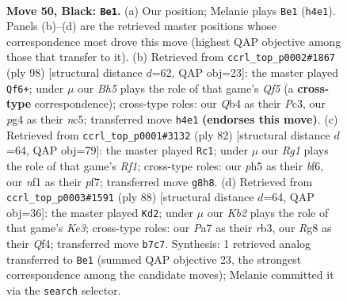 \documentclass[11pt]{article}
\begin{document}
\clearpage

\begin{figure}[p]\centering
\begin{subfigure}{0.46\textwidth}\centering
\resizebox{\linewidth}{!}{%
\newchessgame
\chessboard[
  setfen={r5r1/pk4pQ/7p/3p3P/pq1P2Pb/4P3/6K1/5N2 b - - 9 50},
  showmover=false,
  pgfstyle=straightmove, color=movearrow, markmove={h4-e1}
]}
\caption{}
\end{subfigure}\hfill
\begin{subfigure}{0.46\textwidth}\centering
\resizebox{\linewidth}{!}{%
\newchessgame
\chessboard[
  setfen={5r2/2q2P2/p6k/1pn1PQ1p/6p1/P1P1R3/6PK/8 w - - 2 50},
  showmover=false,
  pgfstyle=straightmove, color=movearrow, markmove={f5-f6}
]}
\caption{}
\end{subfigure}
\\[4pt]
\begin{subfigure}{0.46\textwidth}\centering
\resizebox{\linewidth}{!}{%
\newchessgame
\chessboard[
  setfen={4r1k1/1p3pp1/5b1p/2PR3P/2q1PQ2/8/6P1/5RK1 w - - 1 42},
  showmover=false,
  pgfstyle=straightmove, color=movearrow, markmove={f1-c1}
]}
\caption{}
\end{subfigure}\hfill
\begin{subfigure}{0.46\textwidth}\centering
\resizebox{\linewidth}{!}{%
\newchessgame
\chessboard[
  setfen={6k1/R1p3p1/2Pp4/3P3p/5Q1P/1r2K1Pq/8/R7 w - - 3 45},
  showmover=false,
  pgfstyle=straightmove, color=movearrow, markmove={e3-d2}
]}
\caption{}
\end{subfigure}
\caption{\textbf{Move 50, Black: \texttt{Be1}.} (a) Our position; Melanie plays \texttt{Be1} (\texttt{h4e1}). Panels (b)--(d) are the retrieved master positions whose correspondence most drove this move (highest QAP objective among those that transfer to it). (b) Retrieved from \texttt{ccrl\_top\_p0002\#1867} (ply 98) [structural distance $d$=62, QAP obj=23]: the master played \texttt{Qf6+}; under $\mu$ our \emph{Bh5} plays the role of that game's \emph{Qf5} (a \textbf{cross-type} correspondence); cross-type roles: our \emph{Q}b4 as their \emph{P}c3, our \emph{p}g4 as their \emph{n}c5; transferred move \texttt{h4e1} \textbf{(endorses this move)}. (c) Retrieved from \texttt{ccrl\_top\_p0001\#3132} (ply 82) [structural distance $d$=64, QAP obj=79]: the master played \texttt{Rc1}; under $\mu$ our \emph{Rg1} plays the role of that game's \emph{Rf1}; cross-type roles: our \emph{p}h5 as their \emph{b}f6, our \emph{n}f1 as their \emph{p}f7; transferred move \texttt{g8h8}. (d) Retrieved from \texttt{ccrl\_top\_p0003\#1591} (ply 88) [structural distance $d$=64, QAP obj=36]: the master played \texttt{Kd2}; under $\mu$ our \emph{Kb2} plays the role of that game's \emph{Ke3}; cross-type roles: our \emph{P}a7 as their \emph{r}b3, our \emph{R}g8 as their \emph{Q}f4; transferred move \texttt{b7c7}. Synthesis: 1 retrieved analog transferred to \texttt{Be1} (summed QAP objective 23, the strongest correspondence among the candidate moves); Melanie committed it via the \texttt{search} selector.}
\label{fig:thought-m99}
\end{figure}
\end{document}
